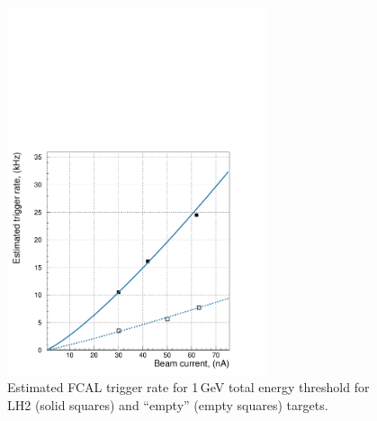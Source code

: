 \begin{figure}[tph]
\centering
\includegraphics[width=3in]{figures/fcalrate_vs_beam.pdf}
\caption{Estimated FCAL trigger rate for 1$\,$GeV
total energy threshold for LH2 (solid squares) and ``empty'' (empty squares) targets.
\label{fig:fcalrate}}
\end{figure}

